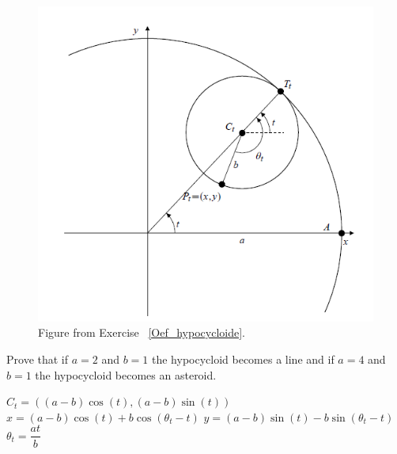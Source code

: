 \begin{Exercise}[difficulty = 3, label=Oef_hypocycloide]
    \begin{figure}[H]
    \centerline{
   \includegraphics[scale=0.8]{fig_parametric_25}
    }
    \caption{Figure from Exercise ~\ref{Oef_hypocycloide}.}
    \label{fig_parametric_25}
    \end{figure}
    
Prove that if $a=2$ and $b=1$ the hypocycloid becomes a line and if $a=4$ and $b=1$ the hypocycloid becomes an asteroid. 

\end{Exercise}

\begin{Answer}\phantom{}
    
        \Question $C_t=\left( (a-b) \cos(t), (a-b) \sin(t) \right)$  
        \Question $x=(a-b) \cos(t) + b \cos(\theta_t-t)$   
        \Question $y=(a-b) \sin(t) - b \sin(\theta_t-t)$ 
        \Question $\theta_t = \dfrac{at}{b}$ 
    
\end{Answer}

\fi	

\ifanalysis \pagebreak \fi
\subsection*{}


